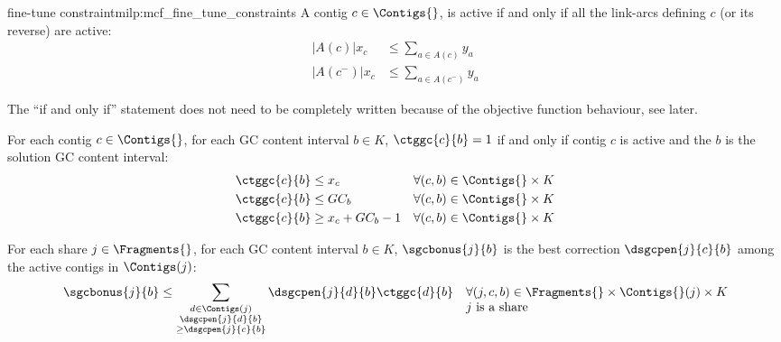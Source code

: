 \begin{definition}{\MCF{} fine-tune constraint}{milp:mcf_fine_tune_constraints}
  A contig \(c \in \Contigs{}\), is active if and only if all the link-arcs defining \(c\) (or its reverse) are active:
  \begin{align}
    |A(c)|x_c & \leq \sum_{a \in A(c)} y_a \\
    |A(c^-)|x_c & \leq \sum_{a \in A(c^-)} y_a
  \end{align}

  \begin{notebox}
    The \enquote{if and only if} statement does not need to be completely written because of the objective function behaviour, see later.
  \end{notebox}

  For each contig \(c \in \Contigs{}\), for each GC content interval \(b \in K\), \(\ctggc{c}{b} = 1\) if and only if contig \(c\) is active and the \(b\) is the solution GC content interval:
  \begin{align}
    \ctggc{c}{b} & \leq x_c & \forall (c, b) \in \Contigs{} \times K \\
    \ctggc{c}{b} & \leq GC_b & \forall (c, b) \in \Contigs{} \times K \\
    \ctggc{c}{b} & \geq x_c + GC_b - 1 & \forall (c, b) \in \Contigs{} \times K
  \end{align}

  For each share \(j \in \Fragments{}\), for each GC content interval \(b \in K\), \(\sgcbonus{j}{b}\) is the best correction \(\dsgcpen{j}{c}{b}\) among the active contigs in \(\Contigs(j)\):
  \begin{equation}
    \sgcbonus{j}{b} \leq \sum_{\substack{
        d \in \Contigs(j) \\ \dsgcpen{j}{d}{b} \\ \geq \dsgcpen{j}{c}{b}
    }} \dsgcpen{j}{d}{b} \ctggc{d}{b} \quad
    \begin{array}[t]{@{}l@{}}
      \forall (j, c, b) \in \Fragments{} \times \Contigs{}(j) \times K \\
      j \text{ is a share}
    \end{array}
  \end{equation}

\end{definition}

